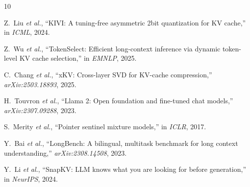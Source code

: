 \documentclass[conference]{IEEEtran}
\begin{document}
\begin{thebibliography}{10}

Z.~Liu \textit{et al.}, ``KIVI: A tuning-free asymmetric 2bit quantization for KV cache,'' in \textit{ICML}, 2024.

Z.~Wu \textit{et al.}, ``TokenSelect: Efficient long-context inference via dynamic token-level KV cache selection,'' in \textit{EMNLP}, 2025.

C.~Chang \textit{et al.}, ``xKV: Cross-layer SVD for KV-cache compression,'' \textit{arXiv:2503.18893}, 2025.

H.~Touvron \textit{et al.}, ``Llama 2: Open foundation and fine-tuned chat models,'' \textit{arXiv:2307.09288}, 2023.

S.~Merity \textit{et al.}, ``Pointer sentinel mixture models,'' in \textit{ICLR}, 2017.

Y.~Bai \textit{et al.}, ``LongBench: A bilingual, multitask benchmark for long context understanding,'' \textit{arXiv:2308.14508}, 2023.

Y.~Li \textit{et al.}, ``SnapKV: LLM knows what you are looking for before generation,'' in \textit{NeurIPS}, 2024.

\end{thebibliography}
\end{document}
